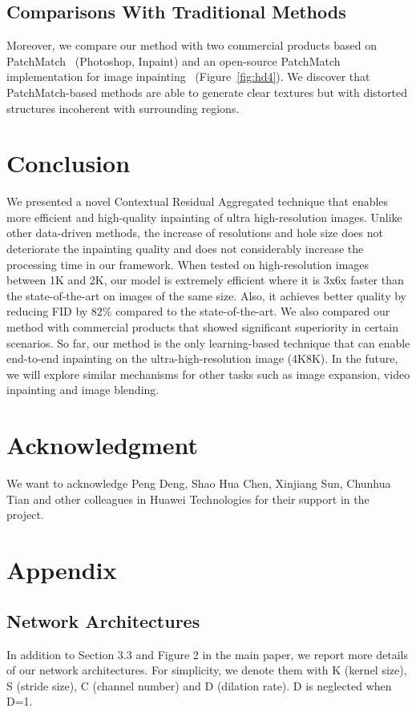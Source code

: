 \documentclass[oribibl]{llncs}  \usepackage[width=122mm,left=12mm,paperwidth=146mm,height=193mm,top=12mm,paperheight=217mm]{geometry}
\begin{document}
\subsection{Comparisons With Traditional Methods} 
Moreover, we compare our method with two commercial products based on PatchMatch~\cite{barnes2009patchmatch} (Photoshop, Inpaint) and an open-source PatchMatch implementation for image inpainting~\cite{Hsieh_patchmatch2019} (Figure~\ref{fig:hd4}). We discover that PatchMatch-based methods are able to generate clear textures but with distorted structures incoherent with surrounding regions.



\section{Conclusion}
We presented a novel Contextual Residual Aggregated technique that enables more efficient and high-quality inpainting of ultra high-resolution images. Unlike other data-driven methods, the increase of resolutions and hole size does not deteriorate the inpainting quality and does not considerably increase the processing time in our framework. When tested on high-resolution images between 1K and 2K, our model is extremely efficient where it is 3x6x faster than the state-of-the-art on images of the same size. Also, it achieves better quality by reducing FID by 82\% compared to the state-of-the-art. We also compared our method with commercial products that showed significant superiority in certain scenarios. So far, our method is the only learning-based technique that can enable end-to-end inpainting on the ultra-high-resolution image (4K8K). In the future, we will explore similar mechanisms for other tasks such as image expansion, video inpainting and image blending.

\section*{Acknowledgment}
We want to acknowledge Peng Deng, Shao Hua Chen, Xinjiang Sun, Chunhua Tian and other colleagues in Huawei Technologies for their support in the project.




\section*{Appendix}
\subsection*{Network Architectures}
In addition to Section 3.3 and Figure 2 in the main paper, we report more details of our network architectures. For simplicity, we denote them with
K (kernel size), S (stride size), C (channel number) and D (dilation rate). D is neglected when D=1.
\end{document}
